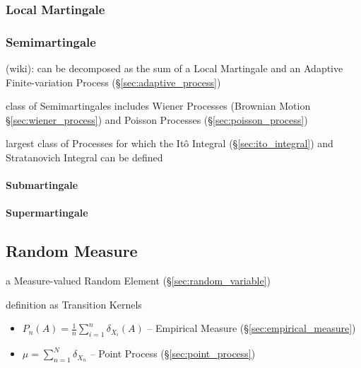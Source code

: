 \subsubsection{Local Martingale}\label{sec:local_martingale}

\subsubsection{Semimartingale}\label{sec:semimartingale}

(wiki): can be decomposed as the sum of a Local Martingale and an Adaptive
Finite-variation Process (\S\ref{sec:adaptive_process})

class of Semimartingales includes Wiener Processes (Brownian Motion
\S\ref{sec:wiener_process}) and Poisson Processes
(\S\ref{sec:poisson_process})

largest class of Processes for which the It\^o Integral
(\S\ref{sec:ito_integral}) and Stratanovich Integral can be defined



\paragraph{Submartingale}\label{sec:submartingale}\hfill

\paragraph{Supermartingale}\label{sec:supermartingale}\hfill



\subsection{Random Measure}\label{sec:random_measure}

a Measure-valued Random Element (\S\ref{sec:random_variable})

definition as Transition Kernels

\begin{itemize}
  \item $P_n(A) = \frac{1}{n}\sum_{i=1}^n \delta_{X_i}(A)$ --
    Empirical Measure (\S\ref{sec:empirical_measure})
  \item $\mu = \sum_{n=1}^N \delta_{X_n}$ -- Point Process
    (\S\ref{sec:point_process})
\end{itemize}



